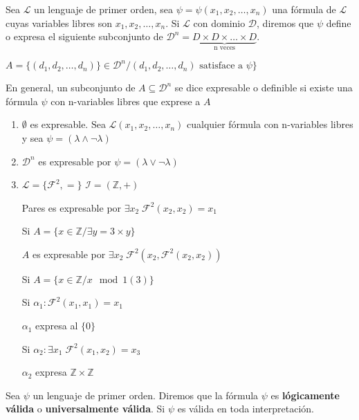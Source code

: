 \begin{definition}

Sea $\mathcal{L}$ un lenguaje de primer orden, sea $\psi = \psi (x_1, x_2, \ldots, x_n)$ una f\'ormula de $\mathcal{L}$ cuyas variables libres son $x_1, x_2, \ldots, x_n$. Si $\mathcal{L}$ con dominio $\mathcal{D}$, diremos que $\psi$ define o expresa el siguiente subconjunto de $\mathcal{D}^n = \underbrace{D \times D \times \ldots \times D}_{\text{n veces}}$.

$A = \{(d_1, d_2, \ldots, d_n)\} \in \mathcal{D}^n / (d_1, d_2, \ldots, d_n) \text{ satisface a }\psi \}$

En general, un subconjunto de $A \subseteq \mathcal{D}^n$ se dice expresable o definible si existe una f\'ormula $\psi$ con n-variables libres que exprese a $A$

\end{definition}

\begin{example}

\begin{enumerate}
	\item $\emptyset$ es expresable. Sea $\mathcal{L}(x_1, x_2, \ldots, x_n)$ cualquier f\'ormula con n-variables libres y sea $\psi = (\lambda \land \neg \lambda)$
	\item $\mathcal{D}^n$ es expresable por $\psi = (\lambda \lor \neg \lambda)$
	\item $\mathcal{L} = \{ \mathcal{F}^2, = \}$ $\mathcal{I} = (\mathbb{Z}, +)$
	
	Pares es expresable por $\exists x_2 \; \mathcal{F}^2(x_2, x_2) = x_1$
	
	Si $A = \{ x \in \mathbb{Z} / \exists y = 3 \times y \}$
	
	$A$ es expresable por $\exists x_2 \; \mathcal{F}^2(x_2, \mathcal{F}^2(x_2, x_2))$
	
	Si $A = \{ x \in \mathbb{Z} / x \mod 1 (3)\}$
	
	Si $\alpha_1 : \mathcal{F}^2(x_1, x_1) = x_1$
	
	$\alpha_1$ expresa al $\{0\}$
	
	Si $\alpha_2 : \exists x_1 \; \mathcal{F}^2(x_1, x_2) = x_3$
	
	$\alpha_2$ expresa $\mathbb{Z} \times \mathbb{Z}$
	
\end{enumerate}

\end{example}

\begin{definition}

Sea $\psi$ un lenguaje de primer orden. Diremos que la f\'ormula $\psi$ es \textbf{l\'ogicamente v\'alida} o \textbf{universalmente v\'alida}. Si $\psi$ es v\'alida en toda interpretaci\'on.

\end{definition}


